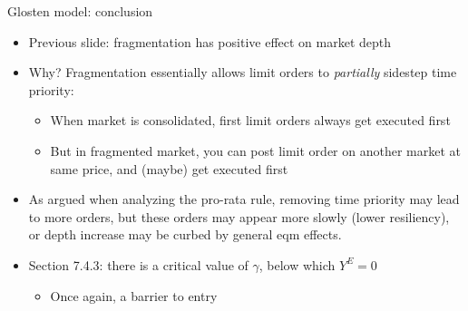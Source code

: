 \documentclass[english,10pt
,aspectratio=169
]{beamer}
\begin{document}
\begin{frame}{Glosten model: conclusion}
	\begin{itemize}
		\item Previous slide: fragmentation has positive effect on market depth
		\item Why?  Fragmentation essentially allows limit orders to \textit{partially} sidestep time priority:
		\begin{itemize}
			\item When market is consolidated, first limit orders always get executed first
			\item But in fragmented market, you can post limit order on another market at same price, and (maybe) get executed first
		\end{itemize}
		\item As argued when analyzing the pro-rata rule, removing time priority may lead to more orders, but these orders may appear more slowly (lower resiliency), or depth increase may be curbed by general eqm effects.
		\item Section 7.4.3: there is a critical value of $\gamma$, below which $Y^E=0$
		\begin{itemize}
			\item Once again, a barrier to entry
		\end{itemize}
	\end{itemize}
\end{frame}
\end{document}
